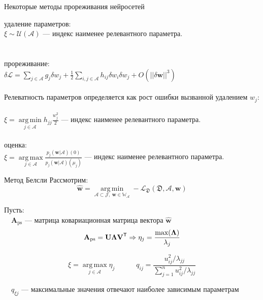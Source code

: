 \documentclass[10pt]{beamer}
\DeclareMathOperator*{\argmin}{arg\,min}
\DeclareMathOperator*{\argmax}{arg\,max}
\begin{document}
\begin{frame}{Некоторые методы прореживания нейросетей}

{ удаление параметров:}\\
\quad
		$\xi \sim \mathcal{U}(\mathcal{A})$ --- индекс наименее релевантного параметра.\\
~\\
~\\
{ прореживание:}\\
\quad
	$\delta \mathcal{L} = \sum_{j\in \mathcal{A}} g_j\delta w_j + \frac{1}{2}\sum_{i,j\in \mathcal{A}} h_{ij}\delta w_i\delta w_j + O(||\delta\textbf{w}||^3)$\\
		~\\

\quad
	Релеватность параметров определяется как рост ошибки вызванной удалением $w_j$:\\
		~\\
\quad
	$\xi = \argmin\limits_{j\in \mathcal{A}}  h_{jj}\frac{w_j^2}{2}$ --- индекс наименее релевантного параметра.\\
	~\\
	
{ оценка:}\\
\quad
	$\xi = \argmax\limits_{j\in \mathcal{A}}\frac{p_j(\textbf{w}|\mathcal{A})(0)}{p_j(\textbf{w}|\mathcal{A})(\mu_j)}$ --- индекс наименее релевантного параметра.
	
\end{frame}

\begin{frame}{Метод Белсли}
Рассмотрим:\\
$$\hat{\textbf{w}} = \argmin\limits_{\mathcal{A}\subset\mathcal{J},~\textbf{w} \in \mathbb{W_\mathcal{A}}} -\mathcal{L}_\mathfrak{D}(\mathfrak{D}, \mathcal{A}, \textbf{w})$$

Пусть:\\
$\quad\textbf{A}_\text{ps}$ --- матрица ковариационная матрица вектора $\hat{\textbf{w}}$\\

$$\textbf{A}_\text{ps} = \textbf{U}{\bf\Lambda}\textbf{V}^\mathsf{T} \Rightarrow \eta_j = \frac{\text{max}({\bf\Lambda})}{\lambda_j}$$

$$\xi = \argmax\limits_{j\in \mathcal{A}}\eta_j \quad\quad\quad q_{ij} = \frac{u^2_{ij}/\lambda_{jj}}{\sum^n_{j=1}{u^2_{ij}/\lambda_{jj}}}$$

$\quad q_{\xi j}$ --- максимальные значения отвечают наиболее зависимым параметрам
	
\end{frame}
\end{document}
